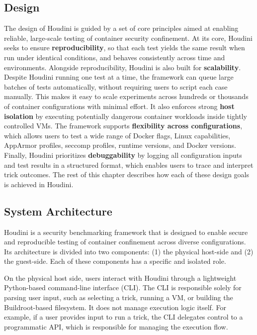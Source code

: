 \documentclass[12pt]{report}
\begin{document}
\begin{doublespace}
\chapter{Design}

The design of Houdini is guided by a set of core principles aimed at enabling reliable, large-scale testing of container security confinement. At its core, Houdini seeks to ensure \textbf{reproducibility}, so that each test yields the same result when run under identical conditions, and behaves consistently across time and environments. Alongside reproducibility, Houdini is also built for \textbf{scalability}. Despite Houdini running one test at a time, the framework can queue large batches of tests automatically, without requiring users to script each case manually. This makes it easy to scale experiments across hundreds or thousands of container configurations with minimal effort. It also enforces strong \textbf{host isolation} by executing potentially dangerous container workloads inside tightly controlled VMs. The framework supports \textbf{flexibility across configurations}, which allows users to test a wide range of Docker flags, Linux capabilities, AppArmor profiles, seccomp profiles, runtime versions, and Docker versions. Finally, Houdini prioritizes \textbf{debuggability} by logging all configuration inputs and test results in a structured format, which enables users to trace and interpret trick outcomes. The rest of this chapter describes how each of these design goals is achieved in Houdini.



\section{System Architecture}
Houdini is a security benchmarking framework that is designed to enable secure and reproducible testing of container confinement across diverse configurations. Its architecture is divided into two components: (1) the physical host-side and (2) the guest-side. Each of these components has a specific and isolated role.

On the physical host side, users interact with Houdini through a lightweight Python-based command-line interface (CLI). The CLI is responsible solely for parsing user input, such as selecting a trick, running a VM, or building the Buildroot-based filesystem. It does not manage execution logic itself. For example, if a user provides input to run a trick, the CLI delegates control to a programmatic API, which is responsible for managing the execution flow.


\end{doublespace}
\end{document}
